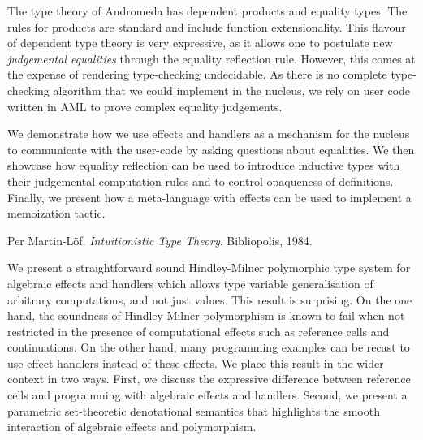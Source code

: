 \documentclass[a4paper,UKenglish]{dagrep}
\begin{document}
The type theory of Andromeda has dependent products and equality types. The
rules for products are standard and include function extensionality. This
flavour of dependent type theory is very expressive, as it allows one to
postulate new \emph{judgemental equalities} through the equality reflection
rule. However, this comes at the expense of rendering type-checking
undecidable. As there is no complete type-checking algorithm that we could
implement in the nucleus, we rely on user code written in AML to prove complex
equality judgements.

We demonstrate how we use effects and handlers as a mechanism for the nucleus
to communicate with the user-code by asking questions about equalities. We then
showcase how equality reflection can be used to introduce inductive types with
their judgemental computation rules and to control opaqueness of definitions.
Finally, we present how a meta-language with effects can be used to implement a
memoization tactic.

\begin{thebibliography}{0}
 Per Martin-Löf. \emph{Intuitionistic Type Theory}. Bibliopolis, 1984.
\end{thebibliography}

\license

We present a straightforward sound Hindley-Milner polymorphic type system for algebraic effects and handlers which allows type variable generalisation of arbitrary computations, and not just values. This result is surprising. On the one hand, the soundness of Hindley-Milner polymorphism is known to fail when not restricted in the presence of computational effects such as reference cells and continuations. On the other hand, many programming examples can be recast to use effect handlers instead of these effects. We place this result in the wider context in two ways. First, we discuss the expressive difference between reference cells and programming with algebraic effects and handlers. Second, we present a parametric set-theoretic denotational semantics that highlights the smooth interaction of algebraic effects and polymorphism.

\license
\end{document}
